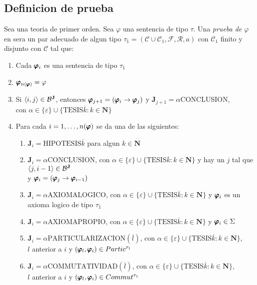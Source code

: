 \subsection{Definicion de prueba}
\begin{definition}
  Sea \forder una teoria de primer orden. Sea $\varphi$ una sentencia de tipo $\tau$. Una \emph{prueba de $\varphi$}
  en \forder sera un par adecuado \padec de algun tipo $\tau_1 = (\mathcal{C}\cup\mathcal{C}_1,\mathcal{F},\mathcal{R},a)$ con $\mathcal{C}_1$ finito y disjunto con $\mathcal{C}$ tal que:
  \begin{enumerate}
    \item Cada $\pmb{\varphi}_i$ es una sentencia de tipo $\tau_1$
    \item $\pmb{\varphi}_{n(\pmb{\varphi})}=\varphi$
    \item Si $\langle i,j\rangle\in\mathcal{B}^\mathbf{J}$, entonces $\pmb{\varphi}_{j+1}=(\pmb{\varphi}_i\rightarrow\pmb{\varphi}_j)$ y $\mathbf{J}_{j+1}=\alpha$CONCLUSION, \\con $\alpha\in\{\varepsilon\}\cup\{\text{TESIS}\overline{k}:k\in\mathbf{N}\}$
    \item Para cada $i=1,\dots,n(\pmb{\varphi})$ se da una de las siguientes:\begin{enumerate}
      \item $\mathbf{J}_i=\text{HIPOTESIS}\overline{k}$ para algun $k\in\mathbf{N}$
      \item $\mathbf{J}_i=\alpha\text{CONCLUSION}$, con $\alpha\in\{\varepsilon\}\cup\{\text{TESIS}\overline{k}:k\in\mathbf{N}\}$ y hay un $j$ tal que $\langle j,i-1\rangle\in\mathcal{B}^\mathbf{J}$\\ y $\pmb{\varphi}_i=(\pmb{\varphi}_j\rightarrow\pmb{\varphi}_{i-1})$
      \item $\mathbf{J}_i=\alpha\text{AXIOMALOGICO}$, con $\alpha\in\{\varepsilon\}\cup\{\text{TESIS}\overline{k}:k\in\mathbf{N}\}$ y $\pmb{\varphi}_i$ es un axioma logico de tipo $\tau_1$
      \item $\mathbf{J}_i=\alpha\text{AXIOMAPROPIO}$, con $\alpha\in\{\varepsilon\}\cup\{\text{TESIS}\overline{k}:k\in\mathbf{N}\}$ y $\pmb{\varphi}_i\in\Sigma$
      \item $\mathbf{J}_i=\alpha\text{PARTICULARIZACION}(\overline{l})$, con $\alpha\in\{\varepsilon\}\cup\{\text{TESIS}\overline{k}:k\in\mathbf{N}\}$,\\ $l$ anterior a $i$ y $(\pmb{\varphi}_l,\pmb{\varphi}_i)\in Partic^{\tau_1}$
      \item $\mathbf{J}_i=\alpha\text{COMMUTATIVIDAD}(\overline{l})$, con $\alpha\in\{\varepsilon\}\cup\{\text{TESIS}\overline{k}:k\in\mathbf{N}\}$, \\$l$ anterior a $i$ y $(\pmb{\varphi}_l,\pmb{\varphi}_i)\in Commut^{\tau_1}$

\end{enumerate}
\end{enumerate}
\end{definition}
